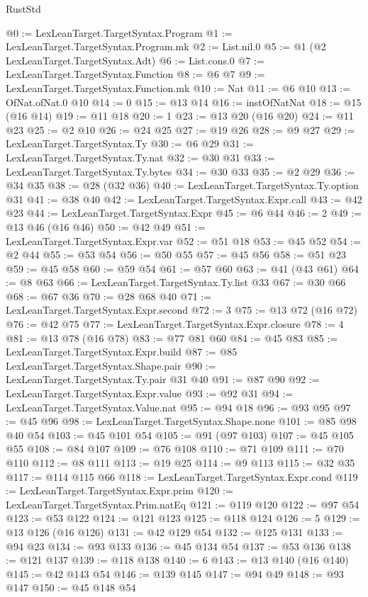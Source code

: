 \begin{lexlean}{RustStd}
\begin{coremodule}
@0 := LexLeanTarget.TargetSyntax.Program
@1 := LexLeanTarget.TargetSyntax.Program.mk
@2 := List.nil.{0}
@5 := @1 (@2 LexLeanTarget.TargetSyntax.Adt)
@6 := List.cons.{0}
@7 := LexLeanTarget.TargetSyntax.Function
@8 := @6 @7
@9 := LexLeanTarget.TargetSyntax.Function.mk
@10 := Nat
@11 := @6 @10
@13 := OfNat.ofNat.{0} @10
@14 := 0
@15 := @13 @14
@16 := instOfNatNat
@18 := @15 (@16 @14)
@19 := @11 @18
@20 := 1
@23 := @13 @20 (@16 @20)
@24 := @11 @23
@25 := @2 @10
@26 := @24 @25
@27 := @19 @26
@28 := @9 @27
@29 := LexLeanTarget.TargetSyntax.Ty
@30 := @6 @29
@31 := LexLeanTarget.TargetSyntax.Ty.nat
@32 := @30 @31
@33 := LexLeanTarget.TargetSyntax.Ty.bytes
@34 := @30 @33
@35 := @2 @29
@36 := @34 @35
@38 := @28 (@32 @36)
@40 := LexLeanTarget.TargetSyntax.Ty.option @31
@41 := @38 @40
@42 := LexLeanTarget.TargetSyntax.Expr.call
@43 := @42 @23
@44 := LexLeanTarget.TargetSyntax.Expr
@45 := @6 @44
@46 := 2
@49 := @13 @46 (@16 @46)
@50 := @42 @49
@51 := LexLeanTarget.TargetSyntax.Expr.var
@52 := @51 @18
@53 := @45 @52
@54 := @2 @44
@55 := @53 @54
@56 := @50 @55
@57 := @45 @56
@58 := @51 @23
@59 := @45 @58
@60 := @59 @54
@61 := @57 @60
@63 := @41 (@43 @61)
@64 := @8 @63
@66 := LexLeanTarget.TargetSyntax.Ty.list @33
@67 := @30 @66
@68 := @67 @36
@70 := @28 @68 @40
@71 := LexLeanTarget.TargetSyntax.Expr.second
@72 := 3
@75 := @13 @72 (@16 @72)
@76 := @42 @75
@77 := LexLeanTarget.TargetSyntax.Expr.closure
@78 := 4
@81 := @13 @78 (@16 @78)
@83 := @77 @81 @60
@84 := @45 @83
@85 := LexLeanTarget.TargetSyntax.Expr.build
@87 := @85 LexLeanTarget.TargetSyntax.Shape.pair
@90 := LexLeanTarget.TargetSyntax.Ty.pair @31 @40
@91 := @87 @90
@92 := LexLeanTarget.TargetSyntax.Expr.value
@93 := @92 @31
@94 := LexLeanTarget.TargetSyntax.Value.nat
@95 := @94 @18
@96 := @93 @95
@97 := @45 @96
@98 := LexLeanTarget.TargetSyntax.Shape.none
@101 := @85 @98 @40 @54
@103 := @45 @101 @54
@105 := @91 (@97 @103)
@107 := @45 @105 @55
@108 := @84 @107
@109 := @76 @108
@110 := @71 @109
@111 := @70 @110
@112 := @8 @111
@113 := @19 @25
@114 := @9 @113
@115 := @32 @35
@117 := @114 @115 @66
@118 := LexLeanTarget.TargetSyntax.Expr.cond
@119 := LexLeanTarget.TargetSyntax.Expr.prim
@120 := LexLeanTarget.TargetSyntax.Prim.natEq
@121 := @119 @120
@122 := @97 @54
@123 := @53 @122
@124 := @121 @123
@125 := @118 @124
@126 := 5
@129 := @13 @126 (@16 @126)
@131 := @42 @129 @54
@132 := @125 @131
@133 := @94 @23
@134 := @93 @133
@136 := @45 @134 @54
@137 := @53 @136
@138 := @121 @137
@139 := @118 @138
@140 := 6
@143 := @13 @140 (@16 @140)
@145 := @42 @143 @54
@146 := @139 @145
@147 := @94 @49
@148 := @93 @147
@150 := @45 @148 @54

\end{coremodule}
\end{lexlean}
